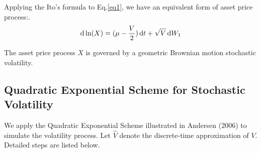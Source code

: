 \documentclass{ws-ijfe}
\begin{document}
Applying the Ito's formula to Eq.\eqref{eq1}, we have an equivalent form of asset price process:.
\begin{equation}\label{logX}
  \d\ln(X)=(\mu-\frac{V}{2})\,\d t+\sqrt{V}\,\d W_1
\end{equation}

The asset price process $X$ is governed by a geometric Brownian motion stochastic volatility.

\subsection{Quadratic Exponential Scheme for Stochastic Volatility}\label{se:QE}
We apply the Quadratic Exponential Scheme illustrated in Andersen (2006) \cite{Andersen} to simulate the volatility process. Let $\hat{V}$ denote the discrete-time approximation of $V$. Detailed steps are listed below.
\end{document}
